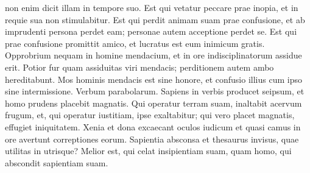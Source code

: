 \begin{biblechapter}
\begin{biblechapter}
\begin{biblechapter}
\begin{biblechapter}
\begin{biblechapter}
\begin{biblechapter}
\begin{biblechapter}
\begin{biblechapter}
\begin{biblechapter}
\begin{biblechapter}
\begin{biblechapter}
\begin{biblechapter}
\begin{biblechapter}
\begin{biblechapter}
\begin{biblechapter}
\begin{biblechapter}
\begin{biblechapter}
\begin{biblechapter}
\begin{biblechapter}
\begin{biblechapter}
 non enim dicit illam in tempore suo.
 \verse Est qui vetatur peccare prae inopia, et in requie sua non stimulabitur.
 \verse Est qui perdit animam suam prae confusione,
 et ab imprudenti persona perdet eam;
 personae autem acceptione perdet se.
 \verse Est qui prae confusione promittit amico,
 et lucratus est eum inimicum gratis.
 \verse Opprobrium nequam in homine mendacium,
 et in ore indisciplinatorum assidue erit.
 \verse Potior fur quam assiduitas viri mendacis;
 perditionem autem ambo hereditabunt.
 \verse Mos hominis mendacis est sine honore,
 et confusio illius cum ipso sine intermissione.
 \verse Verbum parabolarum.
 Sapiens in verbis producet seipsum,
 et homo prudens placebit magnatis.
 \verse Qui operatur terram suam, inaltabit acervum frugum,
 et, qui operatur iustitiam, ipse exaltabitur;
 qui vero placet magnatis, effugiet iniquitatem.
 \verse Xenia et dona excaecant oculos iudicum
 et quasi camus in ore avertunt correptiones eorum.
 \verse Sapientia absconsa et thesaurus invisus,
 quae utilitas in utrisque?
 \verse Melior est, qui celat insipientiam suam,
 quam homo, qui abscondit sapientiam suam.
 

\end{biblechapter}
\end{biblechapter}
\end{biblechapter}
\end{biblechapter}
\end{biblechapter}
\end{biblechapter}
\end{biblechapter}
\end{biblechapter}
\end{biblechapter}
\end{biblechapter}
\end{biblechapter}
\end{biblechapter}
\end{biblechapter}
\end{biblechapter}
\end{biblechapter}
\end{biblechapter}
\end{biblechapter}
\end{biblechapter}
\end{biblechapter}
\end{biblechapter}
